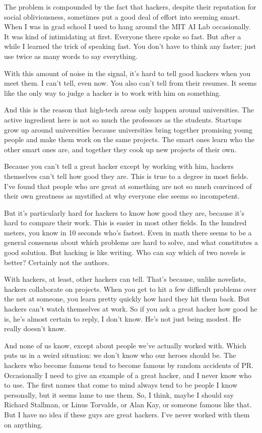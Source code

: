 The problem is compounded by the fact that hackers, despite their
reputation for social obliviousness, sometimes put a good deal of effort
into seeming smart. When I was in grad school I used to hang around the
MIT AI Lab occasionally. It was kind of intimidating at first. Everyone
there spoke so fast. But after a while I learned the trick of speaking
fast. You don't have to think any faster; just use twice as many words
to say everything.

With this amount of noise in the signal, it's hard to tell good hackers
when you meet them. I can't tell, even now. You also can't tell from
their resumes. It seems like the only way to judge a hacker is to work
with him on something.

And this is the reason that high-tech areas only happen around
universities. The active ingredient here is not so much the professors
as the students. Startups grow up around universities because
universities bring together promising young people and make them work on
the same projects. The smart ones learn who the other smart ones are,
and together they cook up new projects of their own.

Because you can't tell a great hacker except by working with him,
hackers themselves can't tell how good they are. This is true to a
degree in most fields. I've found that people who are great at something
are not so much convinced of their own greatness as mystified at why
everyone else seems so incompetent.

But it's particularly hard for hackers to know how good they are,
because it's hard to compare their work. This is easier in most other
fields. In the hundred meters, you know in 10 seconds who's fastest.
Even in math there seems to be a general consensus about which problems
are hard to solve, and what constitutes a good solution. But hacking is
like writing. Who can say which of two novels is better? Certainly not
the authors.

With hackers, at least, other hackers can tell. That's because, unlike
novelists, hackers collaborate on projects. When you get to hit a few
difficult problems over the net at someone, you learn pretty quickly how
hard they hit them back. But hackers can't watch themselves at work. So
if you ask a great hacker how good he is, he's almost certain to reply,
I don't know. He's not just being modest. He really doesn't know.

And none of us know, except about people we've actually worked with.
Which puts us in a weird situation: we don't know who our heroes should
be. The hackers who become famous tend to become famous by random
accidents of PR. Occasionally I need to give an example of a great
hacker, and I never know who to use. The first names that come to mind
always tend to be people I know personally, but it seems lame to use
them. So, I think, maybe I should say Richard Stallman, or Linus
Torvalds, or Alan Kay, or someone famous like that. But I have no idea
if these guys are great hackers. I've never worked with them on
anything.

